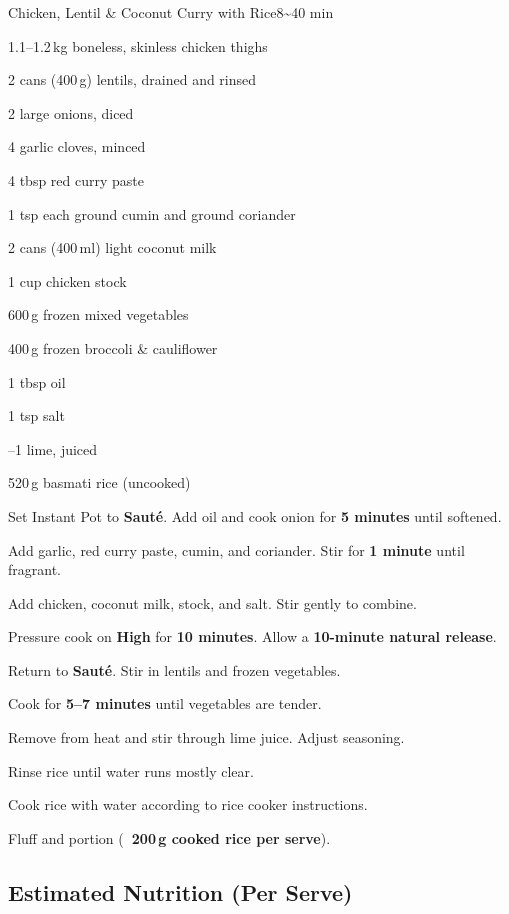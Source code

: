 \begin{recipebox}{Chicken, Lentil \& Coconut Curry with Rice}{8}{\textasciitilde40 min}

\begin{ingredients}
  \item 1.1--1.2\,kg boneless, skinless chicken thighs
  \item 2 cans (400\,g) lentils, drained and rinsed
  \item 2 large onions, diced
  \item 4 garlic cloves, minced
  \item 4 tbsp red curry paste
  \item 1 tsp each ground cumin and ground coriander

  \item 2 cans (400\,ml) light coconut milk
  \item 1 cup chicken stock
  \item 600\,g frozen mixed vegetables
  \item 400\,g frozen broccoli \& cauliflower
  \item 1 tbsp oil
  \item 1 tsp salt
  \item {}--1 lime, juiced
  \item 520\,g basmati rice (uncooked)
\end{ingredients}

\begin{method}
  \item Set Instant Pot to \textbf{Sauté}. Add oil and cook onion for \textbf{5 minutes} until softened.
  \item Add garlic, red curry paste, cumin, and coriander. Stir for \textbf{1 minute} until fragrant.
  \item Add chicken, coconut milk, stock, and salt. Stir gently to combine.
  \item Pressure cook on \textbf{High} for \textbf{10 minutes}. Allow a \textbf{10-minute natural release}.
  \item Return to \textbf{Sauté}. Stir in lentils and frozen vegetables.
  \item Cook for \textbf{5--7 minutes} until vegetables are tender.
  \item Remove from heat and stir through lime juice. Adjust seasoning.
\end{method}

\begin{method}
  \item Rinse rice until water runs mostly clear.
  \item Cook rice with water according to rice cooker instructions.
  \item Fluff and portion (\textbf{~200\,g cooked rice per serve}).
\end{method}

\subsection*{Estimated Nutrition (Per Serve)}

\end{recipebox}
